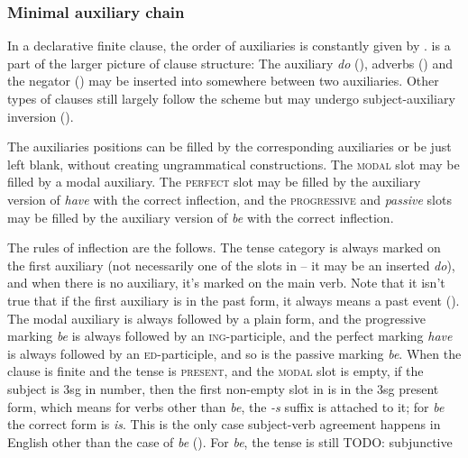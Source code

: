 \documentclass[UTF8, a4paper, oneside, scheme=plain]{ctexrep}
\newcommand{\corpus}[1]{\emph{#1}}
\newcommand{\category}[1]{\textsc{#1}}
\newcommand{\corpuscat}[1]{\textsc{#1}}
\begin{document}
\subsubsection{Minimal auxiliary chain}

In a declarative finite clause,  
the order of auxiliaries is constantly given by .
 is a part of the larger picture of clause structure:
The auxiliary \corpus{do} (), 
adverbs ()
and the negator ()
may be inserted into somewhere between two auxiliaries.
Other types of clauses still largely follow the scheme but 
may undergo subject-auxiliary inversion ().

The auxiliaries positions can be filled by the corresponding auxiliaries or be just left blank,
without creating ungrammatical constructions.
The \category{modal} slot may be filled by a modal auxiliary.
The \category{perfect} slot may be filled by the auxiliary version of \corpus{have} with the correct inflection,
and the \category{progressive} and \corpus{passive} slots 
may be filled by the auxiliary version of \corpus{be} with the correct inflection.

The rules of inflection are the follows.
The tense category is always marked on the first auxiliary
(not necessarily one of the slots in 
-- it may be an inserted \corpus{do}),
and when there is no auxiliary,
it's marked on the main verb.
Note that it isn't true that if the first auxiliary is in the past form,
it always means a past event ().
The modal auxiliary is always followed by a plain form,
and the progressive marking \corpus{be} is always followed by an \corpuscat{ing}-participle,
and the perfect marking \corpus{have} is always followed by an \corpuscat{ed}-participle,
and so is the passive marking \corpus{be}.
When the clause is finite and the tense is \category{present},
and the \category{modal} slot is empty,
if the subject is 3sg in number,
then the first non-empty slot in 
is in the 3sg present form,
which means for verbs other than \corpus{be}, the \corpus{-s} suffix is attached to it;
for \corpus{be} the correct form is \corpus{is}.
This is the only case subject-verb agreement happens in English 
other than the case of \corpus{be} ().
For \corpus{be}, the tense is still  TODO: subjunctive 
\end{document}
